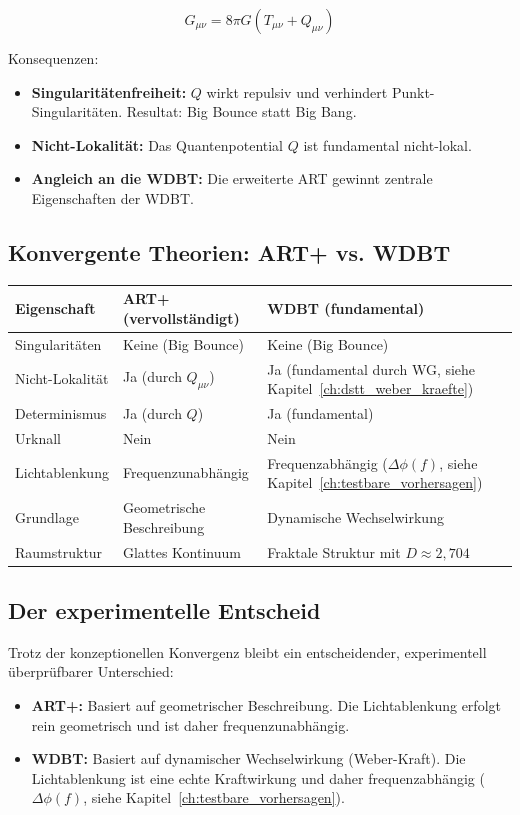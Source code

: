 \[
G_{\mu\nu} = 8\pi G (T_{\mu\nu} + Q_{\mu\nu})
\]

Konsequenzen:

\begin{itemize}
    \item \textbf{Singularitätenfreiheit:} \( Q \) wirkt repulsiv und verhindert Punkt-Singularitäten. Resultat: Big Bounce statt Big Bang.
    \item \textbf{Nicht-Lokalität:} Das Quantenpotential \( Q \) ist fundamental nicht-lokal.
    \item \textbf{Angleich an die WDBT:} Die erweiterte ART gewinnt zentrale Eigenschaften der WDBT.
\end{itemize}

\subsection{Konvergente Theorien: ART+ vs. WDBT}
\label{sub:vergleich_art_vs_wdbt}

\begin{tabular}{|l|l|l|}
\hline
\textbf{Eigenschaft} & \textbf{ART+ (vervollständigt)} & \textbf{WDBT (fundamental)} \\
\hline
Singularitäten & Keine (Big Bounce) & Keine (Big Bounce) \\
Nicht-Lokalität & Ja (durch \( Q_{\mu\nu} \)) & Ja (fundamental durch WG, siehe Kapitel~\ref{ch:dstt_weber_kraefte}) \\
Determinismus & Ja (durch \( Q \)) & Ja (fundamental) \\
Urknall & Nein & Nein \\
Lichtablenkung & Frequenzunabhängig & Frequenzabhängig (\( \Delta\phi(f) \), siehe Kapitel~\ref{ch:testbare_vorhersagen}) \\
Grundlage & Geometrische Beschreibung & Dynamische Wechselwirkung \\
Raumstruktur & Glattes Kontinuum & Fraktale Struktur mit \( D \approx 2,704 \) \\
\hline
\end{tabular}

\subsection{Der experimentelle Entscheid}
\label{sub:vergleich_art_entscheid}

Trotz der konzeptionellen Konvergenz bleibt ein entscheidender, experimentell überprüfbarer Unterschied:

\begin{itemize}
    \item \textbf{ART+:} Basiert auf geometrischer Beschreibung. Die Lichtablenkung erfolgt rein geometrisch und ist daher frequenzunabhängig.
    \item \textbf{WDBT:} Basiert auf dynamischer Wechselwirkung (Weber-Kraft). Die Lichtablenkung ist eine echte Kraftwirkung und daher frequenzabhängig (\( \Delta\phi(f) \), siehe Kapitel~\ref{ch:testbare_vorhersagen}).
\end{itemize}

